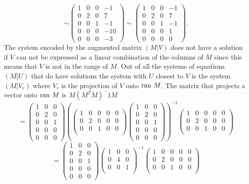 \documentclass[12pt]{article}
\begin{document}
\[
\sim 
\left( \begin{array}{rrr|r}
1 &0&0&-1\\
0      &2&0&7\\
0&0&1&-1\\
0&0&0&-10\\
0&0&0&-3
\end{array} \right)
\sim 
\left( \begin{array}{rrr|r}
1 &0&0&-1\\
0      &2&0&7\\
0&0&1&-1\\
0&0&0&1\\
0&0&0&0
\end{array} \right).
\]
The system encoded by the augmented matrix $(M|V)$ does not have a solution if $V$ can not be expressed as a linear combination of the columns of $M$ since this means that $V$ is not in the range of $M$. 
Out of all the systems of equations $(M|U)$ that do have solutions the system with $U$ closest to $V$ is the system $(M|V_r)$ where $V_r$ is the projection of 
$V$ onto ${\rm ran~} M$. The matrix that projects a vector onto ${\rm ran~} M$ is 
$M(M^TM)^-1 M $
\[= 
\left( \begin{array}{rrr}
1 &0&0\\
0      &2&0\\
0&0&1\\
0&0&0\\
0&0&0
\end{array} \right)
\left(
\left( \begin{array}{rrrrr}
1 &0&0&0&0\\
0      &2&0&0&0\\
0&0&1&0&0\\
\end{array} \right)
\left( \begin{array}{rrr}
1 &0&0\\
0      &2&0\\
0&0&1\\
0&0&0\\
0&0&0
\end{array} \right)
\right)^{-1}
\left( \begin{array}{rrrrr}
1 &0&0&0&0\\
0      &2&0&0&0\\
0&0&1&0&0\\
\end{array} \right)
\]
\[= 
\left( \begin{array}{rrr}
1 &0&0\\
0      &2&0\\
0&0&1\\
0&0&0\\
0&0&0
\end{array} \right)
\left( \begin{array}{rrr}
1 &0&0\\
0      &4&0\\
0&0&1\\
\end{array} \right)^{-1}
\left( \begin{array}{rrrrr}
1 &0&0&0&0\\
0      &2&0&0&0\\
0&0&1&0&0\\
\end{array} \right)
\]
\end{document}
